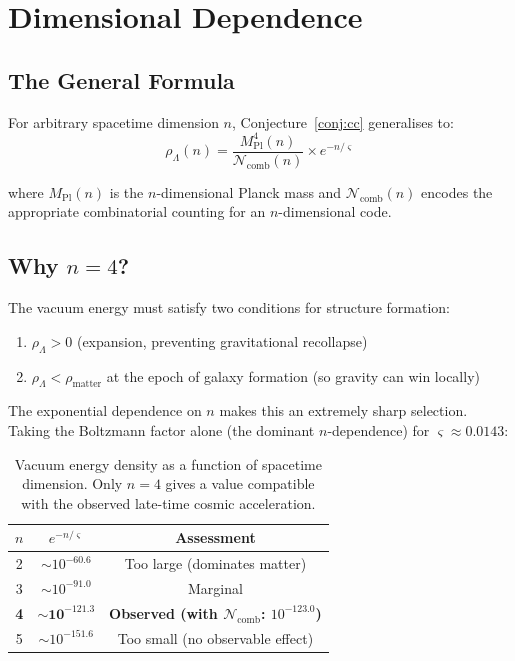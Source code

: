 \documentclass[11pt,a4paper]{article}
\theoremstyle{definition}
\newcommand{\gs}{\varsigma}                %
\newcommand{\Mpl}{M_{\text{Pl}}}
\newcommand{\rhoL}{\rho_{\Lambda}}
\newcommand{\Ncomb}{\mathcal{N}_{\text{comb}}}
\begin{document}
\section{Dimensional Dependence}

\subsection{The General Formula}

For arbitrary spacetime dimension $n$, Conjecture~\ref{conj:cc} generalises to:
\begin{equation}\label{eq:rhoL-n}
    \rhoL(n) = \frac{\Mpl^4(n)}{\Ncomb(n)} \times e^{-n/\gs}
\end{equation}

where $\Mpl(n)$ is the $n$-dimensional Planck mass and $\Ncomb(n)$ encodes the appropriate combinatorial counting for an $n$-dimensional code.

\subsection{Why $n = 4$?}

The vacuum energy must satisfy two conditions for structure formation:
\begin{enumerate}[nosep]
    \item $\rhoL > 0$ (expansion, preventing gravitational recollapse)
    \item $\rhoL < \rho_{\text{matter}}$ at the epoch of galaxy formation (so gravity can win locally)
\end{enumerate}

The exponential dependence on $n$ makes this an extremely sharp selection. Taking the Boltzmann factor alone (the dominant $n$-dependence) for $\gs \approx 0.0143$:

\begin{table}[h]
\centering
\begin{tabular}{ccc}
\toprule
$n$ & $e^{-n/\gs}$ & Assessment \\
\midrule
2 & $\sim 10^{-60.6}$ & Too large (dominates matter) \\
3 & $\sim 10^{-91.0}$ & Marginal \\
\textbf{4} & $\sim \mathbf{10^{-121.3}}$ & \textbf{Observed (with $\Ncomb$: $10^{-123.0}$)} \\
5 & $\sim 10^{-151.6}$ & Too small (no observable effect) \\
\bottomrule
\end{tabular}
\caption{Vacuum energy density as a function of spacetime dimension. Only $n = 4$ gives a value compatible with the observed late-time cosmic acceleration.}
\end{table}
\end{document}
